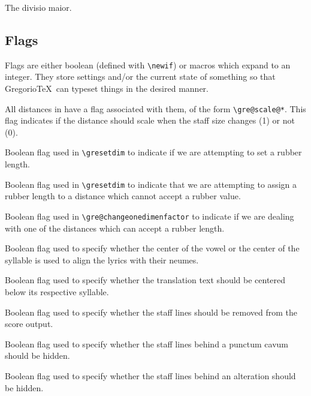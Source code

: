 The divisio maior.


\subsection{Flags}

Flags are either boolean (defined with \verb=\newif=) or macros which expand to an integer.  They store settings and/or the current state of something so that Gregorio\TeX\ can typeset things in the desired manner.

All distances in  have a flag associated with them, of the form \verb=\gre@scale@*=.  This flag
indicates if the distance should scale when the staff size changes (1)
or not (0).

Boolean flag used in \verb=\gresetdim= to indicate if we are attempting to set a rubber length.

Boolean flag used in \verb=\gresetdim= to indicate that we are attempting to assign a rubber length to a distance which cannot accept a rubber value.

Boolean flag used in \verb=\gre@changeonedimenfactor= to indicate if we are dealing with one of the distances which can accept a rubber length.

Boolean flag used to specify whether the center of the vowel or the center of the syllable is used to align the lyrics with their neumes.

Boolean flag used to specify whether the translation text should be centered below its respective syllable.

Boolean flag used to specify whether the staff lines should be removed from the score output.

Boolean flag used to specify whether the staff lines behind a punctum cavum should be hidden.

Boolean flag used to specify whether the staff lines behind an alteration should be hidden.

